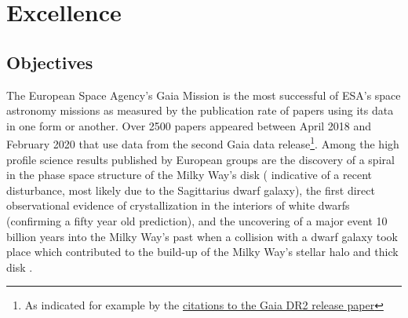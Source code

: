 \renewcommand{\thetable}{\thesection\alph{table}}

\chapter[Excellence]{Excellence}
\label{cha:excellence}

\section{Objectives}
\label{sec:objectives}

The European Space Agency's Gaia Mission \cite{2016A&A...595A...1G} is the most successful of ESA's space astronomy
missions as measured by the publication rate of papers using its data in one form or another. Over 2500 papers appeared
between April 2018 and February 2020 that use data from the second Gaia data release\footnote{As indicated for example by the \href{https://ui.adsabs.harvard.edu/search/q=citations(bibcode\%3A2018A\%26A...616A...1G)&sort=date\%20desc\%2C\%20bibcode\%20desc&p_=0}{citations to the Gaia DR2 release paper}}. Among the high profile science
results published by European groups are the discovery of a spiral in the phase space structure of the Milky Way's disk
(\cite{2018Natur.561..360A} indicative of a recent disturbance, most likely due to the Sagittarius dwarf galaxy), the
first direct observational evidence of crystallization in the interiors of white dwarfs \cite{2019Natur.565..202T} (confirming a fifty year old prediction), and the uncovering of a major event 10 billion years into the Milky Way's past
when a collision with a dwarf galaxy took place which contributed to the build-up of the Milky Way's stellar halo and
thick disk \cite{2018Natur.563...85H, 2018MNRAS.478..611B, 2019arXiv190904679B}. 

